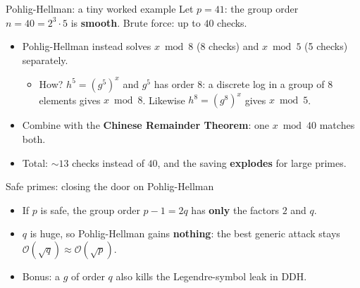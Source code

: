 \ifdefined\PRESENTATION\else\PassOptionsToClass{handout}{beamer}\fi\documentclass[aspectratio=169, lualatex]{beamer}
\begin{document}
\begin{frame}{Pohlig-Hellman: a tiny worked example}
	Let $p = 41$: the group order $n = 40 = 2^3 \cdot 5$ is \textbf{smooth}. Brute force: up to $40$ checks.
	\begin{itemize}[<+->]
		\item Pohlig-Hellman instead solves $x \bmod 8$ (8 checks) and $x \bmod 5$ (5 checks) separately.
		      \begin{itemize}
			      \item How? $h^5 = (g^5)^x$ and $g^5$ has order $8$: a discrete log in a group of $8$ elements gives $x \bmod 8$. Likewise $h^8 = (g^8)^x$ gives $x \bmod 5$.
		      \end{itemize}
		\item Combine with the \textbf{Chinese Remainder Theorem}: one $x \bmod 40$ matches both.
		\item Total: $\sim 13$ checks instead of $40$, and the saving \textbf{explodes} for large primes.
	\end{itemize}
\end{frame}

\begin{frame}{Safe primes: closing the door on Pohlig-Hellman}
	\begin{itemize}[<+->]
		\item If $p$ is safe, the group order $p - 1 = 2q$ has \textbf{only} the factors $2$ and $q$.
		\item $q$ is huge, so Pohlig-Hellman gains \textbf{nothing}: the best generic attack stays $\mathcal{O}(\sqrt{q}) \approx \mathcal{O}(\sqrt{p})$.
		\item Bonus: a $g$ of order $q$ also kills the Legendre-symbol leak in DDH.
	\end{itemize}
\end{frame}
\end{document}
